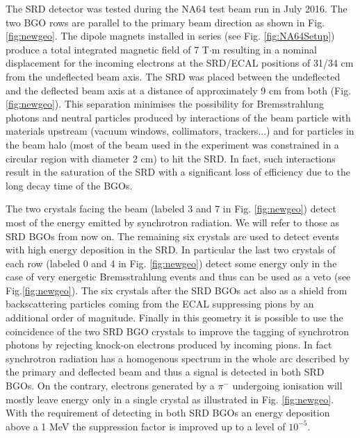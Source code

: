 The SRD detector was tested during the NA64 test beam run in July 2016. The two BGO rows are parallel to the primary beam direction as shown in Fig.\ref{fig:newgeo}. The dipole magnets installed in series (see Fig. \ref{fig:NA64Setup}) produce a total integrated magnetic field of 7 T$\cdot$m \cite{Banerjee:2016tad} resulting in a nominal displacement for the incoming electrons at the SRD/ECAL positions of 31/34 cm from the undeflected beam axis. The SRD was placed between the undeflected and the deflected beam axis at a distance of approximately 9 cm from both (Fig.\ref{fig:newgeo}). This separation minimises the possibility for Bremsstrahlung photons and neutral particles produced by interactions of the beam particle with materials upstream (vacuum windows, collimators, trackers...) and for particles in the beam halo (most of the beam used in the experiment was constrained in a circular region with diameter 2 cm) to hit the SRD. In fact, such interactions result in the saturation of the SRD with a significant loss of efficiency due to the long decay time of the BGOs.


The two crystals facing the beam (labeled 3 and 7 in Fig. \ref{fig:newgeo}) detect most of the energy emitted by synchrotron radiation. We will refer to those as SRD BGOs from now on. The remaining six crystals are used to detect events with high energy deposition in the SRD. In particular the last two crystals of each row (labeled 0 and 4 in Fig. \ref{fig:newgeo}) detect some energy only in the case of very energetic Bremsstrahlung events and thus can be used as a veto (see Fig.\ref{fig:newgeo}). The six crystals after the SRD BGOs act also as a shield from backscattering particles coming from the ECAL suppressing pions by an additional order of magnitude. Finally in this geometry it is possible to use the coincidence of the two SRD BGO crystals to improve the tagging of synchrotron photons by rejecting knock-on electrons produced by incoming pions. In fact synchrotron radiation has a homogenous spectrum in the whole arc described by the primary and deflected beam and thus a signal is detected in both SRD BGOs. On the contrary, electrons generated by a $\pi^-$ undergoing ionisation will mostly leave energy only in a single crystal as illustrated in Fig. \ref{fig:newgeo}. 
With the requirement of detecting in both SRD BGOs an energy deposition above a 1 MeV the suppression factor is improved up to a level of $10^{-5}$.




